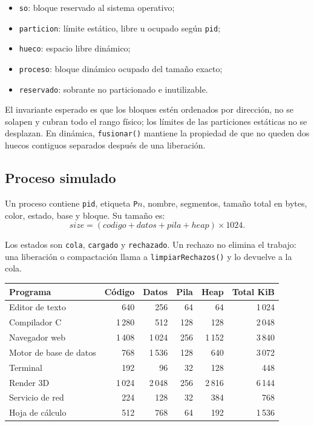 \documentclass[11pt,a4paper]{article}
\newcommand{\funcion}[1]{\texttt{#1()}}
\begin{document}
\begin{itemize}
  \item \texttt{so}: bloque reservado al sistema operativo;
  \item \texttt{particion}: límite estático, libre u ocupado según \texttt{pid};
  \item \texttt{hueco}: espacio libre dinámico;
  \item \texttt{proceso}: bloque dinámico ocupado del tamaño exacto;
  \item \texttt{reservado}: sobrante no particionado e inutilizable.
\end{itemize}

El invariante esperado es que los bloques estén ordenados por dirección, no se
solapen y cubran todo el rango físico; los límites de las particiones estáticas no
se desplazan. En dinámica, \funcion{fusionar} mantiene la propiedad de que no
queden dos huecos contiguos separados después de una liberación.

\subsection{Proceso simulado}

Un proceso contiene \texttt{pid}, etiqueta \texttt{P\(n\)}, nombre, segmentos,
tamaño total en bytes, color, estado, base y bloque. Su tamaño es:
\[
  size=(codigo+datos+pila+heap)\times 1024.
\]

Los estados son \texttt{cola}, \texttt{cargado} y \texttt{rechazado}. Un rechazo
no elimina el trabajo: una liberación o compactación llama a
\funcion{limpiarRechazos} y lo devuelve a la cola.

\begin{longtable}{p{}rrrrr}
\toprule
\textbf{Programa} & \textbf{Código} & \textbf{Datos} & \textbf{Pila} & \textbf{Heap} & \textbf{Total KiB}\\
\midrule
\endhead
Editor de texto & 640 & 256 & 64 & 64 & 1\,024\\
Compilador C & 1\,280 & 512 & 128 & 128 & 2\,048\\
Navegador web & 1\,408 & 1\,024 & 256 & 1\,152 & 3\,840\\
Motor de base de datos & 768 & 1\,536 & 128 & 640 & 3\,072\\
Terminal & 192 & 96 & 32 & 128 & 448\\
Render 3D & 1\,024 & 2\,048 & 256 & 2\,816 & 6\,144\\
Servicio de red & 224 & 128 & 32 & 384 & 768\\
Hoja de cálculo & 512 & 768 & 64 & 192 & 1\,536\\
\bottomrule
\end{longtable}
\end{document}
